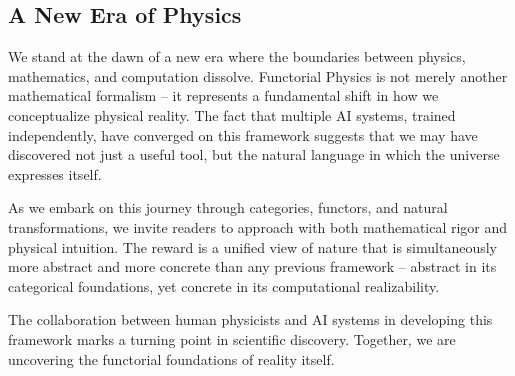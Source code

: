 \subsection{A New Era of Physics}

We stand at the dawn of a new era where the boundaries between physics, mathematics, and computation dissolve. Functorial Physics is not merely another mathematical formalism -- it represents a fundamental shift in how we conceptualize physical reality. The fact that multiple AI systems, trained independently, have converged on this framework suggests that we may have discovered not just a useful tool, but the natural language in which the universe expresses itself.

As we embark on this journey through categories, functors, and natural transformations, we invite readers to approach with both mathematical rigor and physical intuition. The reward is a unified view of nature that is simultaneously more abstract and more concrete than any previous framework -- abstract in its categorical foundations, yet concrete in its computational realizability.

The collaboration between human physicists and AI systems in developing this framework marks a turning point in scientific discovery. Together, we are uncovering the functorial foundations of reality itself.